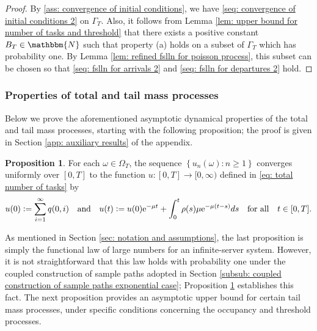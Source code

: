 \documentclass[a4paper, 12pt]{article}
\theoremstyle{definition}
\newtheorem{proposition}[theorem]{Proposition}
\newcommand{\map}[3]{#1 : #2 \longrightarrow #3}
\newcommand{\set}[2]{\left\{#1 : #2\right\}}
\newcommand{\defeq}{\vcentcolon=}
\newcommand{\N}{\mathbbm{N}}
\newcommand{\e}{\mathrm{e}}
\begin{document}
\begin{proof}
By \eqref{ass: convergence of initial conditions}, we have \eqref{seq: convergence of initial conditions 2} on $\Gamma_T$. Also, it follows from Lemma \ref{lem: upper bound for number of tasks and threshold} that there exists a positive constant $B_T \in \N$ such that property (a) holds on a subset of $\Gamma_T$ which has probability one. By Lemma \ref{lem: refined fslln for poisson process}, this subset can be chosen so that \eqref{seq: fslln for arrivals 2} and \eqref{seq: fslln for departures 2} hold.
%
\end{proof}

\subsubsection{Properties of total and tail mass processes}
\label{subsub: properties of total and tail mass functions}

Below we prove the aforementioned asymptotic dynamical properties of the total and tail mass processes, starting with the following proposition; the proof is given in Section \ref{app: auxiliary results} of the appendix.

\begin{proposition}
	\label{prop: total number of tasks}
	For each $\omega \in \Omega_T$, the sequence $\set{u_n(\omega)}{n \geq 1}$ converges uniformly over $[0, T]$ to the function $\map{u}{[0, T]}{[0, \infty)}$ defined in \eqref{eq: total number of tasks} by
	\begin{equation*}
		u(0) \defeq \sum_{i = 1}^\infty q(0, i) \quad \text{and} \quad u(t) \defeq u(0)\e^{-\mu t} + \int_0^t \rho(s) \mu \e^{-\mu(t - s)}ds \quad \text{for all} \quad t \in [0, T].
	\end{equation*}
\end{proposition}

As mentioned in Section \ref{sec: notation and assumptions}, the last proposition is simply the functional law of large numbers for an infinite-server system. However, it is not straightforward that this law holds with probability one under the coupled construction of sample paths adopted in Section \ref{subsub: coupled construction of sample paths exponential case}; Proposition \ref{prop: total number of tasks} establishes this fact. The next proposition provides an asymptotic upper bound for certain tail mass processes, under specific conditions concerning the occupancy and threshold processes.
\end{document}
